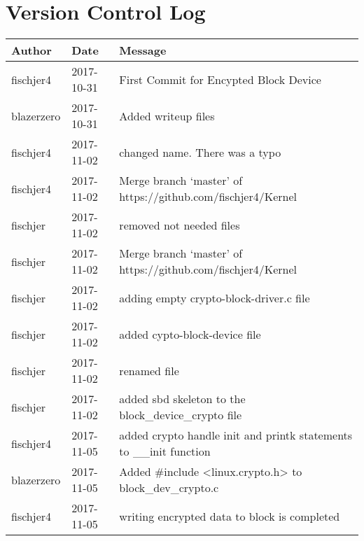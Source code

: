 \documentclass[draftclsnofoot, onecolumn, 10pt, compsoc]{IEEEtran}
\begin{document}
	\section{Version Control Log}
		\begin{center}
			\begin{longtabu} to \textwidth {| X[4,l] | X[3,c] | X[8,l] |}
				\hline
				\textbf{Author} & \textbf{Date} & \textbf{Message} \\ \hline
				
				fischjer4 & 2017-10-31 & First Commit for Encypted Block Device \\ \hline
				
				blazerzero & 2017-10-31 & Added writeup files \\ \hline
				
				fischjer4 & 2017-11-02 & changed name. There was a typo \\ \hline
				
				fischjer4 & 2017-11-02 & Merge branch `master' of https://github.com/fischjer4/Kernel \\ \hline
				
				fischjer & 2017-11-02 & removed not needed files \\ \hline
				
				fischjer & 2017-11-02 & Merge branch `master' of https://github.com/fischjer4/Kernel \\ \hline
				
				fischjer & 2017-11-02 & adding empty crypto-block-driver.c file \\ \hline
				
				fischjer & 2017-11-02 & added cypto-block-device file \\ \hline
				
				fischjer & 2017-11-02 & renamed file \\ \hline
				
				fischjer & 2017-11-02 & added sbd skeleton to the block\_device\_crypto file \\ \hline
				
				fischjer4 & 2017-11-05 & added crypto handle init and printk statements to \_\_init function \\ \hline
				
				blazerzero & 2017-11-05 & Added \#include \textless{}linux.crypto.h\textgreater{} to block\_dev\_crypto.c \\ \hline
				
				fischjer4 & 2017-11-05 & writing encrypted data to block is completed \\ \hline
				

\end{longtabu}
\end{center}
\end{document}
